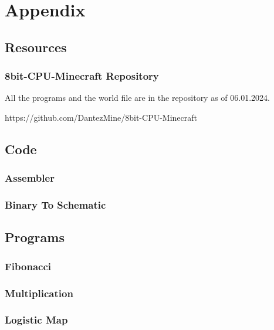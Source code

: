 \chapter{Appendix}

\label{Appendix}

\section{Resources}
\subsection{8bit-CPU-Minecraft Repository} \label{app::Repository}
All the programs and the world file are in the repository as of 06.01.2024.

https://github.com/DantezMine/8bit-CPU-Minecraft

\section{Code}
\subsection{Assembler} \label{app::Assembler}


\subsection{Binary To Schematic} \label{app::BinarySchem}


\section{Programs}
\subsection{Fibonacci} \label{app::Fibonacci}


\subsection{Multiplication} \label{app::Multiplication}


\subsection{Logistic Map} \label{app::LogisticMap}

